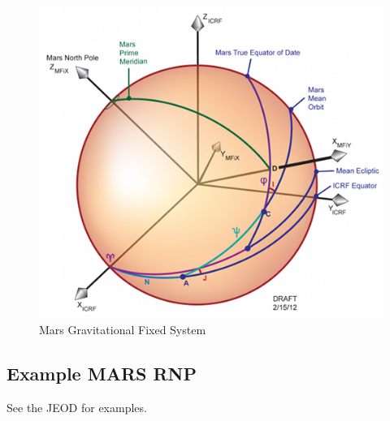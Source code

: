 \begin{figure}[htp]
\centering
\includegraphics [width=7in]{figs/fig7a.png}
\caption{Mars Gravitational Fixed System}
\label{fig:7a}
\end{figure}

\subsection{Example MARS RNP}
See the JEOD  for examples.